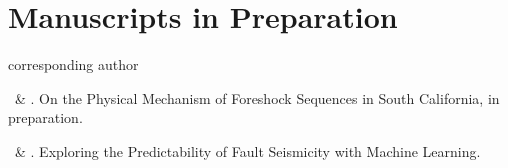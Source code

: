 \section{Manuscripts in Preparation}
\CS corresponding author
\begin{etaremune}
\item \Me\ \& \ZLi\CS.
    On the Physical Mechanism of Foreshock Sequences in South California, in preparation.
\item \Me\ \& \ZLi\CS.
    Exploring the Predictability of Fault Seismicity with Machine Learning.
\end{etaremune}